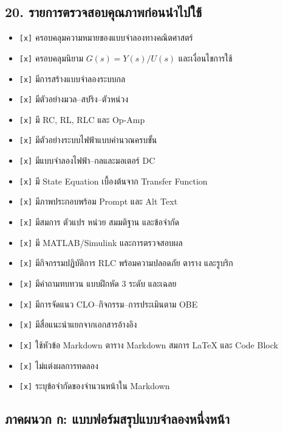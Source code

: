 
\subsection{20. รายการตรวจสอบคุณภาพก่อนนำไปใช้}

\begin{itemize}
    \item \texttt{[x]} ครอบคลุมความหมายของแบบจำลองทางคณิตศาสตร์
    \item \texttt{[x]} ครอบคลุมนิยาม $G(s)=Y(s)/U(s)$ และเงื่อนไขการใช้
    \item \texttt{[x]} มีการสร้างแบบจำลองระบบกล
    \item \texttt{[x]} มีตัวอย่างมวล–สปริง–ตัวหน่วง
    \item \texttt{[x]} มี RC, RL, RLC และ Op-Amp
    \item \texttt{[x]} มีตัวอย่างระบบไฟฟ้าแบบคำนวณครบขั้น
    \item \texttt{[x]} มีแบบจำลองไฟฟ้า–กลและมอเตอร์ DC
    \item \texttt{[x]} มี State Equation เบื้องต้นจาก Transfer Function
    \item \texttt{[x]} มีภาพประกอบพร้อม Prompt และ Alt Text
    \item \texttt{[x]} มีสมการ ตัวแปร หน่วย สมมติฐาน และข้อจำกัด
    \item \texttt{[x]} มี MATLAB/Simulink และการตรวจสอบผล
    \item \texttt{[x]} มีกิจกรรมปฏิบัติการ RLC พร้อมความปลอดภัย ตาราง และรูบริก
    \item \texttt{[x]} มีคำถามทบทวน แบบฝึกหัด 3 ระดับ และเฉลย
    \item \texttt{[x]} มีการจัดแนว CLO–กิจกรรม–การประเมินตาม OBE
    \item \texttt{[x]} มีสื่อแนะนำแยกจากเอกสารอ้างอิง
    \item \texttt{[x]} ใช้หัวข้อ Markdown ตาราง Markdown สมการ LaTeX และ Code Block
    \item \texttt{[x]} ไม่แต่งผลการทดลอง
    \item \texttt{[x]} ระบุข้อจำกัดของจำนวนหน้าใน Markdown
\end{itemize}


\subsection{ภาคผนวก ก: แบบฟอร์มสรุปแบบจำลองหนึ่งหน้า}

